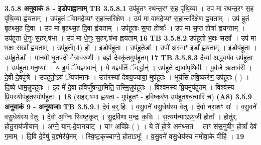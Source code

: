 \documentclass[17pt]{extarticle}
\begin{document}
{{{{{{{{{{{{{{{{{{{                \textbf{ 3.5.8     अनुवाकं   8 - इडोपाह्वानाम्} \newline
                                \textbf{ TB 3.5.8.1} \newline
                  उप॑हूतꣳ रथन्त॒रꣳ स॒ह पृ॑थि॒व्या । उप॑ मा रथन्त॒रꣳ स॒ह पृ॑थि॒व्या ह्व॑यताम् । उप॑हूतं ॅवामदे॒व्यꣳ स॒हान्तरि॑क्षेण । उप॑ मा वामदे॒व्यꣳ स॒हान्तरि॑क्षेण ह्वयताम् । उप॑ हूतं बृ॒हथ्स॒ह दि॒वा । उप॑ मा बृ॒हथ्स॒ह दि॒वा ह्व॑यताम् । उप॑हूताः स॒प्त होत्राः᳚ । उप॑ मा स॒प्त होत्रा᳚ ह्वयन्ताम् । उप॑हूता धे॒नुः स॒हर्.ष॑भा । उप॑ मा धे॒नुः स॒हर्.ष॑भा ह्वयताम् \textbf{ 16} \newline
                  \newline
                                \textbf{ TB 3.5.8.2} \newline
                  उप॑हूतो भ॒क्षः सखा᳚ । उप॑ मा भ॒क्षः सखा᳚ ह्वयताम् । उप॑हू॒ताॅ(4) हो । इडोप॑हूता । उप॑हू॒तेडा᳚ । उपो॑ अ॒स्माꣳ इडा᳚ ह्वयताम् । इडोप॑हूता । उप॑हू॒तेडा᳚ । मा॒न॒वी घृ॒तप॑दी मैत्रावरु॒णी । ब्रह्म॑ दे॒वकृ॑त॒मुप॑हूतम् \textbf{ 17} \newline
                  \newline
                                \textbf{ TB 3.5.8.3} \newline
                  दैव्या॑ अद्ध्व॒र्यव॒ उप॑हूताः । उप॑हूता मनु॒ष्याः᳚ । य इ॒मं ॅय॒ज्ञ्मवान्॑ । ये य॒ज्ञ्प॑तिं॒ ॅवर्द्धान्॑ । उप॑हूते॒ द्यावा॑पृथि॒वी । पू॒र्व॒जे ऋ॒ताव॑री । दे॒वी दे॒वपु॑त्रे । उप॑हूतो॒ऽयं ॅयज॑मानः । उत्त॑रस्यां देवय॒ज्याया॒-मुप॑हूतः । भूय॑सि हवि॒ष्कर॑ण॒ उप॑हूतः ( ) । दि॒व्ये धाम॒न्नुप॑हूतः । इ॒दं मे॑ दे॒वा ह॒विर्जु॑षन्ता॒मिति॒ तस्मि॒न्नुप॑हूतः । विश्व॑मस्य प्रि॒यमुप॑हूतम् । विश्व॑स्य प्रि॒यस्योप॑हूत॒स्योप॑हूतः । \textbf{ 18} \newline
                  \newline
                                    (स॒हर्.ष॑भा ह्वयता॒ - मुप॑हूतꣳ - हवि॒ष्कर॑ण॒ उप॑हूतश्च॒त्वारि॑ च) \textbf{(A8)} \newline \newline
                \textbf{ 3.5.9     अनुवाकं   9 - अनूयाजाः} \newline
                                \textbf{ TB 3.5.9.1} \newline
                  दे॒वं ब॒र्॒.हिः । व॒सु॒वने॑ वसु॒धेय॑स्य वेतु । दे॒वो नरा॒शꣳ सः॑ । व॒सु॒वने॑ वसु॒धेय॑स्य वेतु । दे॒वो अ॒ग्निः स्वि॑ष्ट॒कृत् । सु॒द्रवि॑णा म॒न्द्रः क॒विः । स॒त्यम॑न्माऽऽय॒जी होता᳚ । होतु॑र्. होतु॒राय॑जीयान् । अग्ने॒ यान्-दे॒वानया᳚ट् । याꣳ अपि॑प्रेः ( ) । ये ते॑ हो॒त्रे अम॑थ्सत । ताꣳ स॑स॒नुषीꣳ॒॒ होत्रां᳚ देवं ग॒माम् । दि॒वि दे॒वेषु॑ य॒ज्ञ्मेर॑ये॒मम् । स्वि॒ष्ट॒कृच्चाग्ने॒ होताऽभूः᳚ । व॒सु॒वने॑ वसु॒धेय॑स्य नमोवा॒के वीहि॑ । \textbf{ 19} \newline
}}}}}}}}}}}}}}}}}}}
\end{document}
